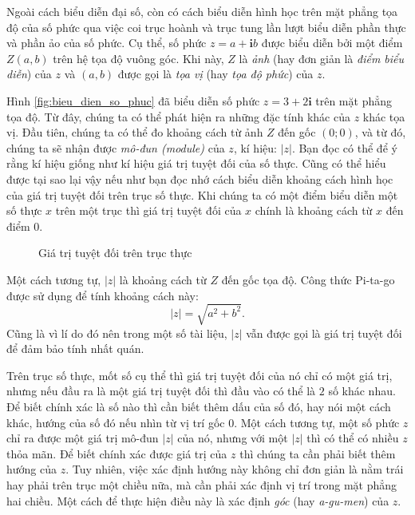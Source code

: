 \documentclass[a4paper, titlepage, openany]{book}
\numberwithin{equation}{chapter}
\begin{document}
Ngoài cách biểu diễn đại số, còn có cách biểu diễn hình học trên mặt phẳng tọa độ của số phức qua việc coi trục hoành và trục tung lần lượt biểu diễn phần thực và phần ảo của số phức. Cụ thể, số phức $z = a + \mathbf{i}b$ được biểu diễn bởi một điểm $Z(a,b)$ trên hệ tọa độ vuông góc. Khi này, $Z$ là \emph{ảnh} (hay đơn giản là \emph{điểm biểu diễn}) của $z$ và $(a,b)$ được gọi là \emph{tọa vị} (hay \emph{tọa độ phức}) của $z$.

Hình \ref{fig:bieu_dien_so_phuc} đã biểu diễn số phức $z = 3 + 2\mathbf{i}$ trên mặt phẳng tọa độ. Từ đây, chúng ta có thể phát hiện ra những đặc tính khác của $z$ khác tọa vị. Đầu tiên, chúng ta có thể đo khoảng cách từ ảnh $Z$ đến gốc $(0;0)$, và từ đó, chúng ta sẽ nhận được \emph{mô-đun (module)} của $z$, kí hiệu: $|z|$. Bạn đọc có thể để ý rằng kí hiệu giống như kí hiệu giá trị tuyệt đối của số thực. Cũng có thể hiểu được tại sao lại vậy nếu như bạn đọc nhớ cách biểu diễn khoảng cách hình học của giá trị tuyệt đối trên trục số thực. Khi chúng ta có một điểm biểu diễn một số thực $x$ trên một trục thì giá trị tuyệt đối của $x$ chính là khoảng cách từ $x$ đến điểm $0$.

\begin{figure}[H]
   \centering
   \caption{Giá trị tuyệt đối trên trục thực}
   \label{fig:gia_tri_tuyet_doi_thuc}
\end{figure}

Một cách tương tự, $|z|$ là khoảng cách từ $Z$ đến gốc tọa độ. Công thức Pi-ta-go được sử dụng để tính khoảng cách này: $$|z| = \sqrt{a^2+b^2}.$$ Cũng là vì lí do đó nên trong một số tài liệu, $|z|$ vẫn được gọi là giá trị tuyệt đối để đảm bảo tính nhất quán.

Trên trục số thực, mốt số cụ thể thì giá trị tuyệt đối của nó chỉ có một giá trị, nhưng nếu đầu ra là một giá trị tuyệt đối thì đầu vào có thể là $2$ số khác nhau. Để biết chính xác là số nào thì cần biết thêm dấu của số đó, hay nói một cách khác, hướng của số đó nếu nhìn từ vị trí gốc $0$. Một cách tương tự, một số phức $z$ chỉ ra được một giá trị mô-đun $|z|$ của nó, nhưng với một $|z|$ thì có thể có nhiều $z$ thỏa mãn. Để biết chính xác được giá trị của $z$ thì chúng ta cần phải biết thêm hướng của $z$. Tuy nhiên, việc xác định hướng này không chỉ đơn giản là nằm trái hay phải trên trục một chiều nữa, mà cần phải xác định vị trí trong mặt phẳng hai chiều. Một cách để thực hiện điều này là xác định \emph{góc} (hay \emph{a-gu-men}) của $z$.
\end{document}
